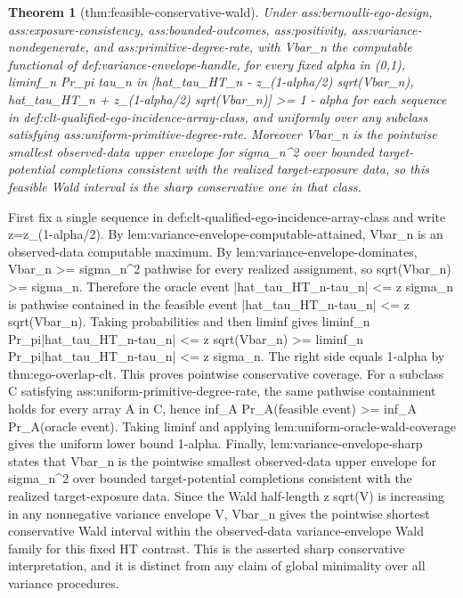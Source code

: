 \documentclass{article}
\newtheorem{theorem}{Theorem}
\begin{document}
\begin{theorem}[thm:feasible-conservative-wald]\label{thm:feasible-conservative-wald}
Under ass:bernoulli-ego-design, ass:exposure-consistency, ass:bounded-outcomes, ass:positivity, ass:variance-nondegenerate, and ass:primitive-degree-rate, with Vbar_n the computable functional of def:variance-envelope-handle, for every fixed alpha in (0,1), liminf_n Pr_pi{ tau_n in [hat_tau_HT_n - z_(1-alpha/2) sqrt(Vbar_n), hat_tau_HT_n + z_(1-alpha/2) sqrt(Vbar_n)] } >= 1 - alpha for each sequence in def:clt-qualified-ego-incidence-array-class, and uniformly over any subclass satisfying ass:uniform-primitive-degree-rate. Moreover Vbar_n is the pointwise smallest observed-data upper envelope for sigma_n^2 over bounded target-potential completions consistent with the realized target-exposure data, so this feasible Wald interval is the sharp conservative one in that class.
\end{theorem}
First fix a single sequence in def:clt-qualified-ego-incidence-array-class and write z=z_(1-alpha/2). By lem:variance-envelope-computable-attained, Vbar_n is an observed-data computable maximum. By lem:variance-envelope-dominates, Vbar_n >= sigma_n^2 pathwise for every realized assignment, so sqrt(Vbar_n) >= sigma_n. Therefore the oracle event {|hat_tau_HT_n-tau_n| <= z sigma_n} is pathwise contained in the feasible event {|hat_tau_HT_n-tau_n| <= z sqrt(Vbar_n)}. Taking probabilities and then liminf gives liminf_n Pr_pi{|hat_tau_HT_n-tau_n| <= z sqrt(Vbar_n)} >= liminf_n Pr_pi{|hat_tau_HT_n-tau_n| <= z sigma_n}. The right side equals 1-alpha by thm:ego-overlap-clt. This proves pointwise conservative coverage. For a subclass C satisfying ass:uniform-primitive-degree-rate, the same pathwise containment holds for every array A in C, hence inf_A Pr_A(feasible event) >= inf_A Pr_A(oracle event). Taking liminf and applying lem:uniform-oracle-wald-coverage gives the uniform lower bound 1-alpha. Finally, lem:variance-envelope-sharp states that Vbar_n is the pointwise smallest observed-data upper envelope for sigma_n^2 over bounded target-potential completions consistent with the realized target-exposure data. Since the Wald half-length z sqrt(V) is increasing in any nonnegative variance envelope V, Vbar_n gives the pointwise shortest conservative Wald interval within the observed-data variance-envelope Wald family for this fixed HT contrast. This is the asserted sharp conservative interpretation, and it is distinct from any claim of global minimality over all variance procedures.
\end{document}

